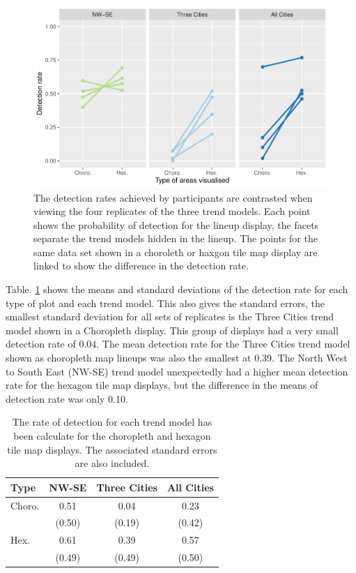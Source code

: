 \documentclass[conference,final,]{IEEEtran}
\makeatletter
\def\maxwidth{\ifdim\Gin@nat@width>\linewidth\linewidth
\else\Gin@nat@width\fi}
\let\Oldincludegraphics\includegraphics
\renewcommand{\includegraphics}[1]{\Oldincludegraphics[width=\maxwidth]{#1}}
\makeatother
\begin{document}
\begin{figure}
\centering
\includegraphics{paper_files/figure-latex/detect-compare-1.pdf}
\caption{\label{fig:detect-compare}The detection rates achieved by participants are contrasted when viewing the four replicates of the three trend models. Each point shows the probability of detection for the lineup display, the facets separate the trend models hidden in the lineup. The points for the same data set shown in a choroleth or haxgon tile map display are linked to show the difference in the detection rate.}
\end{figure}

Table. \ref{tab:desc-stats} shows the means and standard deviations of the detection rate for each type of plot and each trend model. This also gives the standard errors, the smallest standard deviation for all sets of replicates is the Three Cities trend model shown in a Choropleth display. This group of displays had a very small detection rate of 0.04. The mean detection rate for the Three Cities trend model shown as choropleth map lineups was also the smallest at 0.39.
The North West to South East (NW-SE) trend model unexpectedly had a higher mean detection rate for the hexagon tile map displays, but the difference in the means of detection rate was only 0.10.

\begin{table}

\caption{\label{tab:desc-stats}The rate of detection for each trend model has been calculate for the choropleth and hexagon tile map displays. The associated standard errors are also included.}
\centering
\begin{tabular}[t]{lccc}
\toprule
Type & NW-SE & Three Cities & All Cities\\
\midrule
Choro. & 0.51 & 0.04 & 0.23\\
 & (0.50) & (0.19) & (0.42)\\
\addlinespace
Hex. & 0.61 & 0.39 & 0.57\\
 & (0.49) & (0.49) & (0.50)\\
\bottomrule
\end{tabular}
\end{table}
\end{document}
